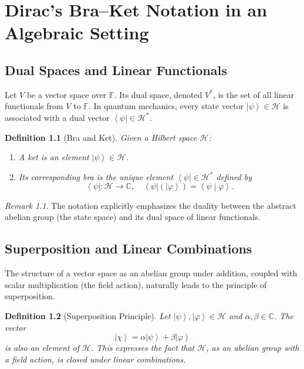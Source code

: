 \documentclass[11pt,oneside]{book}
\newtheorem{definition}{Definition}[chapter]
\theoremstyle{remark}
\newtheorem*{remark}{Remark}
\renewcommand{\ket}[1]{\left| #1 \right\rangle}
\renewcommand{\bra}[1]{\left\langle #1 \right|}
\renewcommand{\braket}[2]{\left\langle #1 \middle| #2 \right\rangle}
\begin{document}
	\chapter{Dirac’s Bra–Ket Notation in an Algebraic Setting}
	\section{Dual Spaces and Linear Functionals}
	Let $V$ be a vector space over $\mathbb{F}$. Its dual space, denoted $V^*$, is the set of all linear functionals from $V$ to $\mathbb{F}$. In quantum mechanics, every state vector $\ket{\psi}\in \mathcal{H}$ is associated with a dual vector $\bra{\psi}\in \mathcal{H}^*$.
	
	\begin{definition}[Bra and Ket]
		Given a Hilbert space $\mathcal{H}$:
		\begin{enumerate}[label=(\alph*)]
			\item A \emph{ket} is an element $\ket{\psi}\in\mathcal{H}$.
			\item Its corresponding \emph{bra} is the unique element $\bra{\psi}\in\mathcal{H}^*$ defined by
			\[
			\bra{\psi} : \mathcal{H} \to \mathbb{C}, \quad \bra{\psi}(\ket{\varphi}) = \braket{\psi}{\varphi}.
			\]
		\end{enumerate}
	\end{definition}
	
	\begin{remark}
		The notation explicitly emphasizes the duality between the abstract abelian group (the state space) and its dual space of linear functionals.
	\end{remark}
	
	\section{Superposition and Linear Combinations}
	The structure of a vector space as an abelian group under addition, coupled with scalar multiplication (the field action), naturally leads to the principle of superposition.
	
	\begin{definition}[Superposition Principle]
		Let $\ket{\psi},\ket{\varphi}\in\mathcal{H}$ and $\alpha,\beta\in\mathbb{C}$. The vector
		\[
		\ket{\chi} = \alpha\ket{\psi} + \beta\ket{\varphi}
		\]
		is also an element of $\mathcal{H}$. This expresses the fact that $\mathcal{H}$, as an abelian group with a field action, is closed under linear combinations.
	\end{definition}
	
\end{document}
